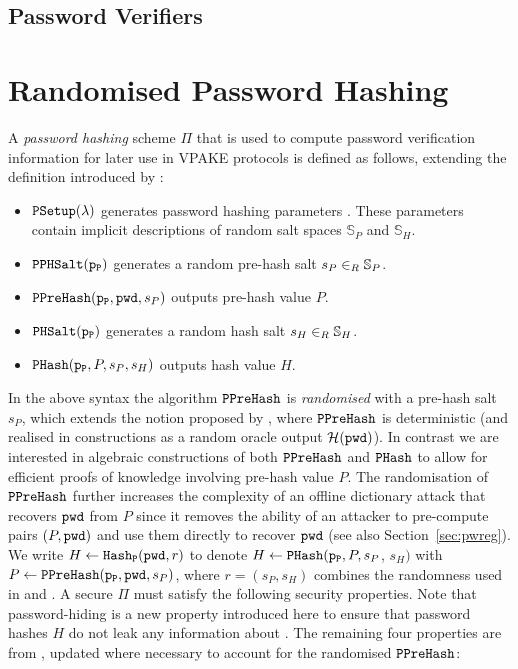 \subsection{Password Verifiers}



\section{Randomised Password Hashing} \label{sec:strucphash}
A \emph{password hashing} scheme $\Pi$ that is used to compute password verification information \ver for later use in \ac{VPAKE} protocols is defined as follows, extending the definition introduced by \citet{BenhamoudaP13}:

\begin{itemize}
	\item $\mathtt{PSetup}(\lambda)$ generates password hashing parameters \paramP. 
	  These parameters contain implicit descriptions of random salt spaces $\mathbb{S}_P$ and $\mathbb{S}_H$.
	\item $\mathtt{PPHSalt}(\mathtt{p_P})$ generates a random pre-hash salt $s_P\in_R\mathbb{S}_P$.
	\item $\mathtt{PPreHash}(\mathtt{p_P}, \mathtt{pwd}, s_P)$ outputs pre-hash value $P$.
	\item $\mathtt{PHSalt}(\mathtt{p_P})$ generates a random hash salt $s_H\in_R\mathbb{S}_H$.
	\item $\mathtt{PHash}(\mathtt{p_P}, P, s_P, s_H)$ outputs hash value $H$.
\end{itemize}

\noindent
In the above syntax the algorithm $\mathtt{PPreHash}$ is \emph{randomised} with a pre-hash salt $s_P$, which extends the notion proposed by \citet{BenhamoudaP13}, where $\mathtt{PPreHash}$ is deterministic (and realised in constructions as a random oracle output $\mathcal{H}(\mathtt{pwd})$). 
In contrast we are interested in algebraic constructions of both $\mathtt{PPreHash}$ and $\mathtt{PHash}$ to allow for efficient proofs of knowledge involving pre-hash value $P$. 
The randomisation of $\mathtt{PPreHash}$ further increases the complexity of an offline dictionary attack that recovers $\mathtt{pwd}$ from $P$ since it removes the ability of an attacker to pre-compute pairs $(P,\mathtt{pwd})$ and use them directly to recover $\mathtt{pwd}$ (see also Section~\ref{sec:pwreg}). 
We write $H\gets \mathtt{Hash_P}(\mathtt{pwd},r)$ to denote $H\gets \mathtt{PHash}(\mathtt{p_P},P,s_P$, $s_H)$ with $P\gets\mathtt{PPreHash}(\mathtt{p_P},\mathtt{pwd},s_P)$, where $r=(s_P,s_H)$ combines the randomness used in \PHash and \PPreHash. 
A secure $\Pi$ must satisfy the following security properties. 
Note that password-hiding is a new property introduced here to ensure that password hashes $H$ do not leak any information about \pwd. 
The remaining four properties are from \cite{BenhamoudaP13}, updated where necessary to account for the randomised $\mathtt{PPreHash}$:

